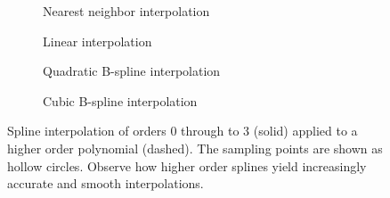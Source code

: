 \begin{figure}[htpb]
    \centering
    \begin{subfigure}[b]{0.475\textwidth}
    \centering
       \caption[]{{\small Nearest neighbor interpolation}}
    \label{fig:itp_nnb}
    \end{subfigure}
    \begin{subfigure}[b]{0.475\textwidth}
    \centering
       \caption[]{{\small Linear interpolation}}
    \label{fig:itp_lin}
    \end{subfigure}

    \begin{subfigure}[b]{0.475\textwidth}
    \centering
       \caption[]{{\small Quadratic B-spline interpolation}}
    \label{fig:itp_nnb}
    \end{subfigure}
    \begin{subfigure}[b]{0.475\textwidth}
    \centering
       \caption[]{{\small Cubic B-spline interpolation}}
    \label{fig:itp_lin}
    \end{subfigure}
    \caption[Aviici is love, Aviici is life]
    {Spline interpolation of orders 0 through to 3 (solid) applied to a higher
        order polynomial (dashed). The sampling points are shown as hollow
        circles. Observe how higher order splines yield increasingly accurate
        and smooth interpolations.
    }
\end{figure}

